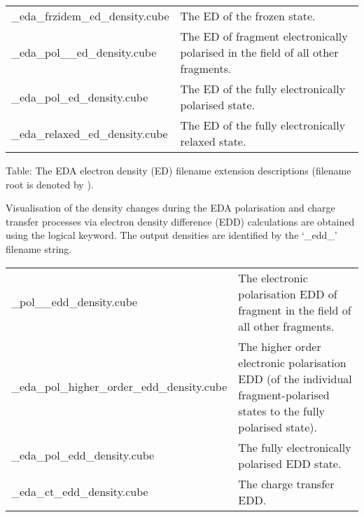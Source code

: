 \documentclass[letterpaper,10pt,english]{sphinxmanual}
\begin{document}
\begin{savenotes}\sphinxattablestart
\centering
\begin{tabulary}{\linewidth}[t]{|T|T|}
\hline
{}\relax &\relax \\
\hline
{}\_eda\_frzidem\_ed\_density.cube
&
The ED of the frozen state.
\\
\hline
{}\_eda\_pol\_\_ed\_density.cube
&
The ED of fragment  electronically polarised in the field of all other fragments.
\\
\hline
{}\_eda\_pol\_ed\_density.cube
&
The ED of the fully electronically polarised state.
\\
\hline
{}\_eda\_relaxed\_ed\_density.cube
&
The ED of the fully electronically relaxed state.
\\
\hline
\end{tabulary}
\par
\sphinxattableend\end{savenotes}

Table: The EDA electron density (ED) filename extension descriptions
(filename root is denoted by ).

Visualisation of the density changes during the EDA polarisation and
charge transfer processes via electron density difference (EDD)
calculations are obtained using the  logical keyword.
The output densities are identified by the ‘\_edd\_’ filename string.


\begin{savenotes}\sphinxattablestart
\centering
\begin{tabulary}{\linewidth}[t]{|T|T|}
\hline
{}\relax &\relax \\
\hline
{}\_pol\_\_edd\_density.cube
&
The electronic polarisation EDD of fragment  in the field of all other fragments.
\\
\hline
{}\_eda\_pol\_higher\_order\_edd\_density.cube
&
The higher order electronic polarisation EDD (of the individual fragment-polarised states to the fully polarised state).
\\
\hline
{}\_eda\_pol\_edd\_density.cube
&
The fully electronically polarised EDD state.
\\
\hline
{}\_eda\_ct\_edd\_density.cube
&
The charge transfer EDD.
\\
\hline
\end{tabulary}
\par
\sphinxattableend\end{savenotes}
\end{document}
